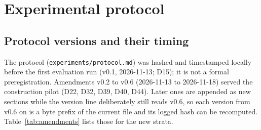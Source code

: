\section{Experimental protocol}
\label{sec:protocol}
\subsection{Protocol versions and their timing}
\label{sec:amendments}
The protocol (\texttt{experiments/protocol.md}) was hashed and timestamped locally before the first evaluation run (v0.1, 2026-11-13; D15); it is not a formal preregistration. Amendments v0.2 to v0.6 (2026-11-13 to 2026-11-18) served the construction pilot (D22, D32, D39, D40, D44). Later ones are appended as new sections while the version line deliberately still reads v0.6, so each version from v0.6 on is a byte prefix of the current file and its logged hash can be recomputed. Table~\ref{tab:amendments} lists those for the new strata.

